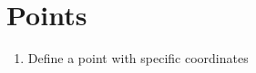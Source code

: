 \documentclass[a4paper]{article}
\newcommand{\myShowPoints}[2]{
\tkzDrawPoints(#1) \tkzLabelPoints[#2](#1)
}
\begin{document}
\section{Points} %
\label{sec:points}
\begin{enumerate}
	\item Define a point with specific coordinates 
	\begin{figure}[h]
	\centering
	\end{figure}
\end{enumerate}

\end{document}
